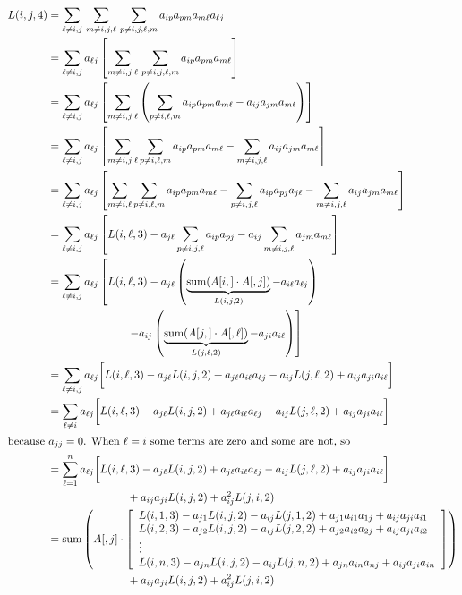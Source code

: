 \documentclass[11pt]{article} %
\begin{document}
\begin{align}
  L(i,j,4) &= \sum_{\ell \neq i,j} \, \sum_{m\neq i,j,\ell} \, \sum_{p\neq i,j,\ell,m} a_{ip} a_{pm} a_{m\ell} a_{\ell j} \\
  &= \sum_{\ell \neq i,j}  a_{\ell j} \left[ \sum_{m\neq i,j,\ell} \, \sum_{p\neq i,j,\ell,m} a_{ip} a_{pm} a_{m\ell} \right] \\
  &= \sum_{\ell \neq i,j}  a_{\ell j} \left[ \sum_{m\neq i,j,\ell} \left( \sum_{p\neq i,\ell,m} a_{ip} a_{pm} a_{m\ell} - a_{ij} a_{jm} a_{m\ell} \right) \right] \\
  &= \sum_{\ell \neq i,j}  a_{\ell j} \left[ \sum_{m\neq i,j,\ell} \sum_{p\neq i,\ell,m} a_{ip} a_{pm} a_{m\ell} - \sum_{m\neq i,j,\ell} a_{ij} a_{jm} a_{m\ell} \right] \\
  &= \sum_{\ell \neq i,j}  a_{\ell j} \left[ \sum_{m\neq i,\ell} \sum_{p\neq i,\ell,m} a_{ip} a_{pm} a_{m\ell} - \sum_{p\neq i,j,\ell} a_{ip} a_{pj} a_{j\ell} - \sum_{m\neq i,j,\ell} a_{ij} a_{jm} a_{m\ell} \right] \\
  &= \sum_{\ell \neq i,j}  a_{\ell j} \left[ L(i,\ell,3) - a_{j\ell} \sum_{p\neq i,j,\ell} a_{ip} a_{pj} - a_{ij} \sum_{m\neq i,j,\ell} a_{jm} a_{m\ell} \right] \\
  &= \sum_{\ell \neq i,j}  a_{\ell j} \left[ L(i,\ell,3) - a_{j\ell} \left( \underbrace{\text{sum}(A[i,] \cdot A[,j])}_{L(i,j,2)} - a_{i\ell} a_{\ell j} \right) \right. \nonumber \\
  &{} \hspace{1in} \left. - a_{ij} \left( \underbrace{\text{sum}(A[j,] \cdot A[,\ell])}_{L(j,\ell,2)} - a_{ji} a_{i\ell} \right) \right] \\
  &= \sum_{\ell \neq i,j}  a_{\ell j} \biggl[ L(i,\ell,3) - a_{j\ell} L(i,j,2) + a_{j\ell} a_{i\ell} a_{\ell j} - a_{ij} L(j,\ell,2) + a_{ij} a_{ji} a_{i\ell} \biggr] \\
  &= \sum_{\ell \neq i}  a_{\ell j} \biggl[ L(i,\ell,3) - a_{j\ell} L(i,j,2) + a_{j\ell} a_{i\ell} a_{\ell j} - a_{ij} L(j,\ell,2) + a_{ij} a_{ji} a_{i\ell} \biggr] \\
\intertext{because $a_{jj}=0$. When $\ell=i$ some terms are zero and some are not, so}
  &= \sum_{\ell=1}^n  a_{\ell j} \biggl[ L(i,\ell,3) - a_{j\ell} L(i,j,2) + a_{j\ell} a_{i\ell} a_{\ell j} - a_{ij} L(j,\ell,2) + a_{ij} a_{ji} a_{i\ell} \biggr] \nonumber \\
  &{} \hspace{1in} + a_{ij} a_{ji} L(i,j,2) + a_{ij}^2 L(j,i,2) \\
  &= \text{sum} \left( A[,j] \cdot \left[ \begin{array}{l} L(i,1,3) - a_{j1}L(i,j,2) - a_{ij}L(j,1,2) + a_{j1}a_{i1}a_{1 j} + a_{ij}a_{ji}a_{i1} \\ L(i,2,3) - a_{j2}L(i,j,2) - a_{ij}L(j,2,2) + a_{j2}a_{i2}a_{2 j} + a_{ij}a_{ji}a_{i2} \\ \vdots \\ L(i,n,3) - a_{jn}L(i,j,2) - a_{ij}L(j,n,2) + a_{jn}a_{in}a_{n j} + a_{ij}a_{ji}a_{in} \end{array} \right] \right) \nonumber \\
  &{} \hspace{1in} + a_{ij} a_{ji} L(i,j,2) + a_{ij}^2 L(j,i,2)
\end{align}
\end{document}
